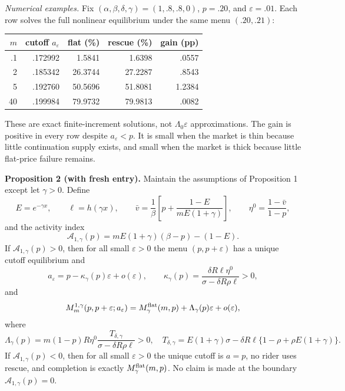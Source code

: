 \documentclass[11pt]{article}
\begin{document}
\medskip
\noindent\textit{Numerical examples.}
Fix $(\alpha,\beta,\delta,\gamma)=(1,.8,.8,0)$,
$p=.20$, and $\varepsilon=.01$.  Each row solves the full nonlinear
equilibrium under the same menu $(.20,.21)$:
\begin{center}
\scriptsize
\begin{tabular}{@{}rrrrr@{}}
\toprule
$m$ & cutoff $a_\varepsilon$ & flat (\%) & rescue (\%) & gain (pp)\\
\midrule
.1 & .172992 &  1.5841 &  1.6398 & .0557\\
2  & .185342 & 26.3744 & 27.2287 & .8543\\
5  & .192760 & 50.5696 & 51.8081 & 1.2384\\
40 & .199984 & 79.9732 & 79.9813 & .0082\\
\bottomrule
\end{tabular}
\end{center}
\vspace{-5pt}
\noindent These are exact finite-increment solutions, not
$\Lambda_0\varepsilon$ approximations.  The gain is positive in every row
despite $a_\varepsilon<p$.  It is small when the market is thin because little
continuation supply exists, and small when the market is thick because little
flat-price failure remains.

\clearpage
\noindent\textbf{Proposition 2 (with fresh entry).}
Maintain the assumptions of Proposition 1 except let $\gamma>0$.  Define
\[
E=e^{-\gamma x},\qquad \ell=h(\gamma x),\qquad
\bar v=\frac1\beta\left[p+\frac{1-E}{mE(1+\gamma)}\right],\qquad
\eta^0=\frac{1-\bar v}{1-p},
\]
and the activity index
\[
\mathcal A_{1,\gamma}(p)
=mE(1+\gamma)(\beta-p)-(1-E).
\]
If $\mathcal A_{1,\gamma}(p)>0$, then for all small $\varepsilon>0$ the menu
$(p,p+\varepsilon)$ has a unique cutoff equilibrium and
\[
a_\varepsilon=p-\kappa_\gamma(p)\varepsilon+o(\varepsilon),\qquad
\kappa_\gamma(p)=
\frac{\delta R\ell\eta^0}{\sigma-\delta R\rho\ell}>0,
\]
and
\[
M_m^{1,\gamma}(p,p+\varepsilon;a_\varepsilon)
=M_\gamma^{\rm flat}(m,p)+\Lambda_\gamma(p)\varepsilon+o(\varepsilon),
\]
where
\[
\Lambda_\gamma(p)=m(1-p)R\eta^0
\frac{T_{\delta,\gamma}}{\sigma-\delta R\rho\ell}>0,
\quad
T_{\delta,\gamma}=E(1+\gamma)\sigma-
\delta R\ell\{1-\rho+\rho E(1+\gamma)\}. \tag{P5}
\]
If $\mathcal A_{1,\gamma}(p)<0$, then for all small $\varepsilon>0$ the
unique cutoff is $a=p$, no rider uses rescue, and completion is exactly
$M_\gamma^{\rm flat}(m,p)$.  No claim is made at the boundary
$\mathcal A_{1,\gamma}(p)=0$.
\end{document}

